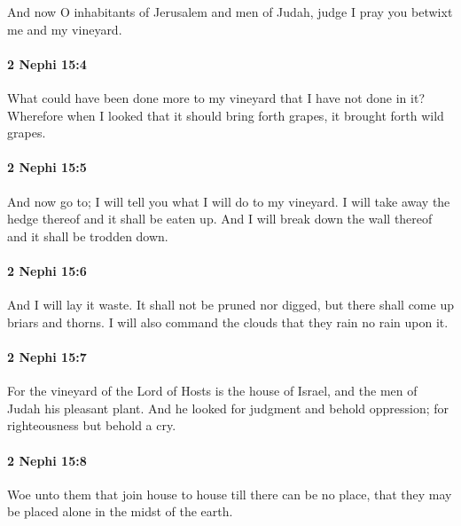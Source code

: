 			And now O inhabitants of Jerusalem and men of Judah,
			judge I pray you betwixt me and my vineyard.

		\paragraph{2 Nephi 15:4} %
			\label{2NEPHI-15-4}

			What could have been done more to my vineyard that I have not done in it?
			Wherefore when I looked that it should bring forth grapes,
			it brought forth wild grapes.

		\paragraph{2 Nephi 15:5} %
			\label{2NEPHI-15-5}

			And now go to;
			I will tell you what I will do to my vineyard.
			I will take away the hedge thereof and it shall be eaten up.
			And I will break down the wall thereof and it shall be trodden down.

		\paragraph{2 Nephi 15:6} %
			\label{2NEPHI-15-6}

			And I will lay it waste.
			It shall not be pruned nor digged,
			but there shall come up briars and thorns.
			I will also command the clouds that they rain no rain upon it.

		\paragraph{2 Nephi 15:7} %
			\label{2NEPHI-15-7}

			For the vineyard of the Lord of Hosts is the house of Israel,
			and the men of Judah his pleasant plant.
			And he looked for judgment and behold oppression;
			for righteousness but behold a cry.

		\paragraph{2 Nephi 15:8} %
			\label{2NEPHI-15-8}

			Woe unto them that join house to house till there can be no place,
			that they may be placed alone in the midst of the earth.

